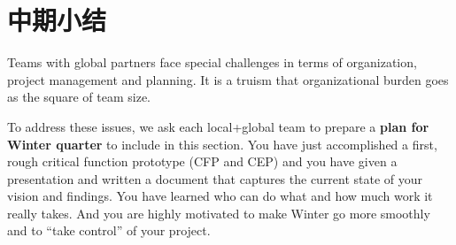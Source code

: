\chapter{中期小结}
\label{mid-project review}

\begin{remark}\color{blue}
Teams with global partners face special challenges in  terms of organization, project management and planning.
It is a truism that organizational burden goes as the square of team size. 

To address these issues, we ask each local+global team to prepare a \textbf{plan for Winter quarter} to include in this section. You have just accomplished a first, rough critical function prototype (CFP and CEP) and you have given a presentation and written a document that captures the current state of your vision and findings. You have learned who can do what and how much work it really takes. And you are highly motivated to make Winter go more smoothly and to ``take control'' of your project.
\normalcolor
\end{remark}



